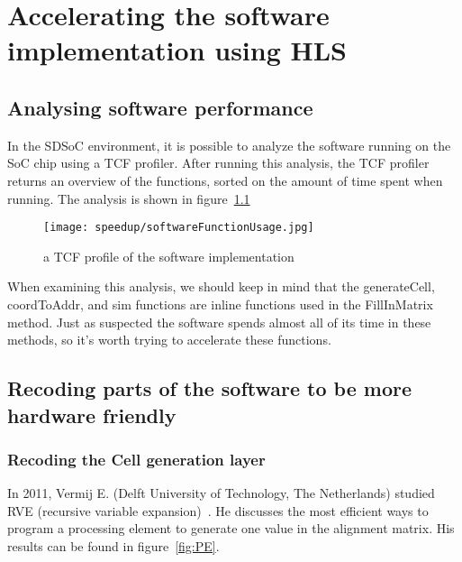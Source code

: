 
\chapter{Accelerating the software implementation using HLS}
\label{ch:HardwareImpl}

\section{Analysing software performance}
\label{swAnalyse}

In the SDSoC environment, it is possible to analyze the software running on the SoC chip using a TCF profiler. After running this analysis, the TCF profiler returns an overview of the functions, sorted on the amount of time spent when running. The analysis is shown in figure~\ref{fig:softwareFunctionUsage}

\begin{figure}[H]
	\centering
	\texttt{[image: speedup/softwareFunctionUsage.jpg]}
	\caption{a TCF profile of the software implementation}
	\label{fig:softwareFunctionUsage}
\end{figure}

When examining this analysis, we should keep in mind that the generateCell, coordToAddr, and sim functions are inline functions used in the FillInMatrix method. Just as suspected the software spends almost all of its time in these methods, so it's worth trying to accelerate these functions.

\section{Recoding parts of the software to be more hardware friendly}

\subsection{Recoding the Cell generation layer}

In 2011, Vermij E. (Delft University of Technology, The Netherlands) studied RVE (recursive variable expansion)~\cite{Vermij}. He discusses the most efficient ways to program a processing element to generate one value in the alignment matrix. His results can be found in figure~\ref{fig:PE}. 

